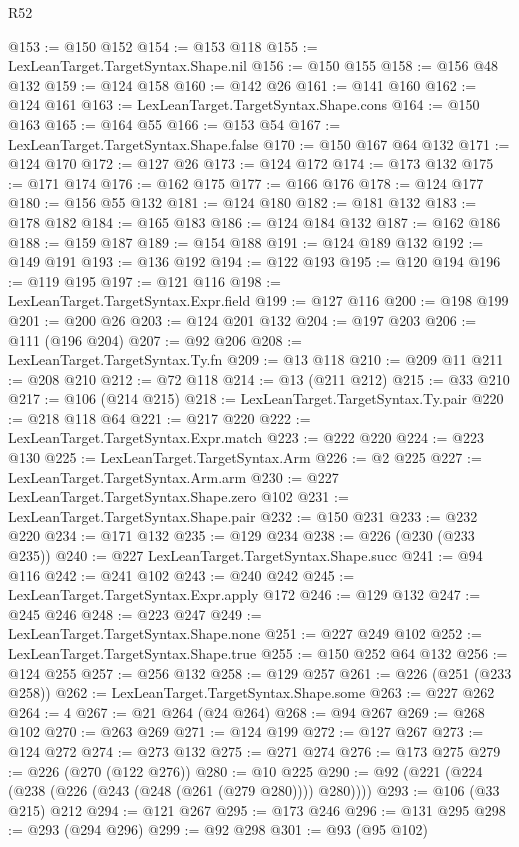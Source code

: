 \begin{lexlean}{R52}
\begin{coremodule}
@153 := @150 @152
@154 := @153 @118
@155 := LexLeanTarget.TargetSyntax.Shape.nil
@156 := @150 @155
@158 := @156 @48 @132
@159 := @124 @158
@160 := @142 @26
@161 := @141 @160
@162 := @124 @161
@163 := LexLeanTarget.TargetSyntax.Shape.cons
@164 := @150 @163
@165 := @164 @55
@166 := @153 @54
@167 := LexLeanTarget.TargetSyntax.Shape.false
@170 := @150 @167 @64 @132
@171 := @124 @170
@172 := @127 @26
@173 := @124 @172
@174 := @173 @132
@175 := @171 @174
@176 := @162 @175
@177 := @166 @176
@178 := @124 @177
@180 := @156 @55 @132
@181 := @124 @180
@182 := @181 @132
@183 := @178 @182
@184 := @165 @183
@186 := @124 @184 @132
@187 := @162 @186
@188 := @159 @187
@189 := @154 @188
@191 := @124 @189 @132
@192 := @149 @191
@193 := @136 @192
@194 := @122 @193
@195 := @120 @194
@196 := @119 @195
@197 := @121 @116
@198 := LexLeanTarget.TargetSyntax.Expr.field
@199 := @127 @116
@200 := @198 @199
@201 := @200 @26
@203 := @124 @201 @132
@204 := @197 @203
@206 := @111 (@196 @204)
@207 := @92 @206
@208 := LexLeanTarget.TargetSyntax.Ty.fn
@209 := @13 @118
@210 := @209 @11
@211 := @208 @210
@212 := @72 @118
@214 := @13 (@211 @212)
@215 := @33 @210
@217 := @106 (@214 @215)
@218 := LexLeanTarget.TargetSyntax.Ty.pair
@220 := @218 @118 @64
@221 := @217 @220
@222 := LexLeanTarget.TargetSyntax.Expr.match
@223 := @222 @220
@224 := @223 @130
@225 := LexLeanTarget.TargetSyntax.Arm
@226 := @2 @225
@227 := LexLeanTarget.TargetSyntax.Arm.arm
@230 := @227 LexLeanTarget.TargetSyntax.Shape.zero @102
@231 := LexLeanTarget.TargetSyntax.Shape.pair
@232 := @150 @231
@233 := @232 @220
@234 := @171 @132
@235 := @129 @234
@238 := @226 (@230 (@233 @235))
@240 := @227 LexLeanTarget.TargetSyntax.Shape.succ
@241 := @94 @116
@242 := @241 @102
@243 := @240 @242
@245 := LexLeanTarget.TargetSyntax.Expr.apply @172
@246 := @129 @132
@247 := @245 @246
@248 := @223 @247
@249 := LexLeanTarget.TargetSyntax.Shape.none
@251 := @227 @249 @102
@252 := LexLeanTarget.TargetSyntax.Shape.true
@255 := @150 @252 @64 @132
@256 := @124 @255
@257 := @256 @132
@258 := @129 @257
@261 := @226 (@251 (@233 @258))
@262 := LexLeanTarget.TargetSyntax.Shape.some
@263 := @227 @262
@264 := 4
@267 := @21 @264 (@24 @264)
@268 := @94 @267
@269 := @268 @102
@270 := @263 @269
@271 := @124 @199
@272 := @127 @267
@273 := @124 @272
@274 := @273 @132
@275 := @271 @274
@276 := @173 @275
@279 := @226 (@270 (@122 @276))
@280 := @10 @225
@290 := @92 (@221 (@224 (@238 (@226 (@243 (@248 (@261 (@279 @280)))) @280))))
@293 := @106 (@33 @215) @212
@294 := @121 @267
@295 := @173 @246
@296 := @131 @295
@298 := @293 (@294 @296)
@299 := @92 @298
@301 := @93 (@95 @102)

\end{coremodule}
\end{lexlean}
